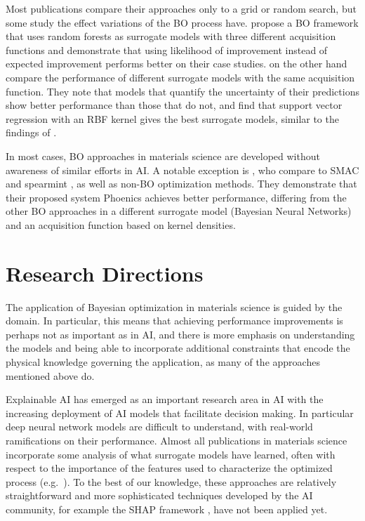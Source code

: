 \documentclass{article}
\begin{document}
Most publications compare their approaches only to a grid or random search, but
some study the effect variations of the BO process have.
\cite{ling_high-dimensional_2017} propose a BO framework that uses random
forests as surrogate models with three different acquisition functions and
demonstrate that using likelihood of improvement instead of expected improvement
performs better on their case studies. \cite{balachandran_adaptive_2016} on the
other hand compare the performance of different surrogate models with the same
acquisition function. They note that models that quantify the uncertainty of
their predictions show better performance than those that do not, and find that
support vector regression with an RBF kernel gives the best surrogate models,
similar to the findings of \cite{seko_machine_2014}.


\medskip

In most cases, BO approaches in materials science are developed without
awareness of similar efforts in AI. A notable exception is
\cite{hase_phoenics_2018}, who compare to SMAC \citep{hutter_sequential_2011}
and spearmint \citep{snoek_practical_2012}, as well as non-BO optimization
methods. They demonstrate that their proposed system Phoenics achieves better
performance, differing from the other BO approaches in a different surrogate
model (Bayesian Neural Networks) and an acquisition function based on kernel
densities.

\section{Research Directions}

The application of Bayesian optimization in materials science is guided by the
domain. In particular, this means that achieving performance improvements
is perhaps not as important as in AI, and there is more emphasis on
understanding the models and being able to incorporate additional constraints
that encode the physical knowledge governing the application, as many of the
approaches mentioned above do.

Explainable AI has emerged as an important research area in AI with the
increasing deployment of AI models that facilitate decision making. In
particular deep neural network models are difficult to understand, with
real-world ramifications on their performance. Almost all publications in
materials science incorporate some analysis of what surrogate models have
learned, often with respect to the importance of the features used to
characterize the optimized process (e.g.~\cite{kotthoff_ai_2019}). To the best of
our knowledge, these approaches are relatively straightforward and more
sophisticated techniques developed by the AI community, for example the SHAP
framework \cite{lundberg_unified_2017}, have not been applied yet.
\end{document}
